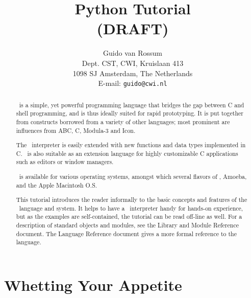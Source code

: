 

\title{\bf
	Python Tutorial \\
	(DRAFT)
}

\author{
	Guido van Rossum \\
	Dept. CST, CWI, Kruislaan 413 \\
	1098 SJ Amsterdam, The Netherlands \\
	E-mail: {\tt guido@cwi.nl}
}




\maketitle

\begin{abstract}

\noindent
\Python\ is a simple, yet powerful programming language that bridges the
gap between C and shell programming, and is thus ideally suited for rapid
prototyping.
It is put together from constructs borrowed from a variety of other
languages; most prominent are influences from ABC, C, Modula-3 and Icon.

The \Python\ interpreter is easily extended with new functions and data
types implemented in C.
\Python\ is also suitable as an extension language for highly
customizable C applications such as editors or window managers.

\Python\ is available for various operating systems, amongst which
several flavors of \UNIX, Amoeba, and the Apple Macintosh O.S.

This tutorial introduces the reader informally to the basic concepts and
features of the \Python\ language and system.
It helps to have a \Python\ interpreter handy for hands-on experience,
but as the examples are self-contained, the tutorial can be read
off-line as well.
For a description of standard objects and modules, see the Library and
Module Reference document.
The Language Reference document gives a more formal reference to the
language.

\end{abstract}

\pagebreak

\tableofcontents

\pagebreak


\section{Whetting Your Appetite}

